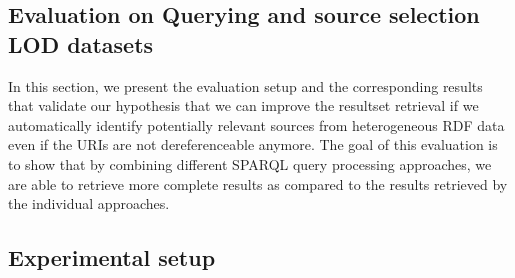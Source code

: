 \documentclass[sw]{iosart2x}
\begin{document}

\subsection{Evaluation on Querying and source selection LOD datasets}
In this section, we present the evaluation setup and the corresponding results that validate our hypothesis that we can improve the resultset retrieval if we automatically identify potentially relevant sources from heterogeneous RDF data even if the URIs are not dereferenceable anymore. The goal of this evaluation is to show that by combining different SPARQL query processing approaches, we are able to retrieve more complete results as compared to the results retrieved by the individual approaches. 
\subsection{Experimental setup}
\end{document}
